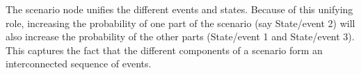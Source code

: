 \documentclass{article}
\begin{document}
\noindent
 The scenario node unifies the different events and states.  
 Because of this unifying role, increasing the probability of one part of the scenario (say \textsf{State/event 2}) will also increase the probability of the other parts (\textsf{State/event 1} and  \textsf{State/event 3}). This captures the fact that  the different components 
 of a scenario form an interconnected sequence of events. 
 

%
%
%
%
%
%
%
\end{document}
